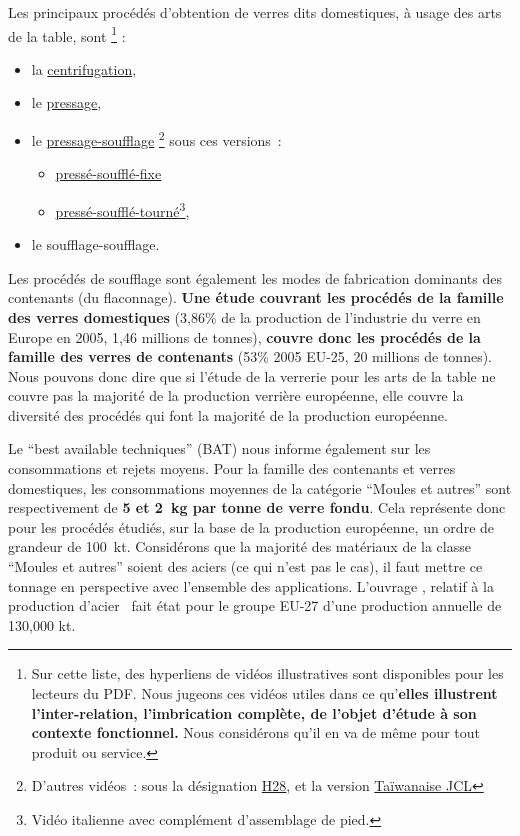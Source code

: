 Les principaux procédés d'obtention de verres dits domestiques, à usage des arts de la table, sont
\footnote{
Sur cette liste, des hyperliens de vidéos illustratives sont disponibles pour les lecteurs du PDF.
Nous jugeons ces vidéos utiles dans ce qu'\textbf{elles illustrent l'inter-relation, l'imbrication complète, de l'objet d'étude à son contexte fonctionnel.}
Nous considérons qu'il en va de même pour tout produit ou service.
} :
\begin{itemize}
\item la \href{https://www.youtube.com/watch?v=HQw2rP-yffU}{centrifugation},
\item le \href{https://www.youtube.com/watch?v=f4q5RphNFwo}{pressage},
\item le \href{https://www.youtube.com/watch?v=o_HqEeMmrfI}{pressage-soufflage}
\footnote{
D'autres vidéos~: sous la désignation \href{https://www.youtube.com/watch?v=SypruPV9CNw}{H28}, et la version \href{https://www.youtube.com/watch?v=Dqo06N7eofA}{Taïwanaise JCL}
}
sous ces versions~:
\begin{itemize}
\item \href{https://www.youtube.com/watch?v=ixAIrgkHnIo}{pressé-soufflé-fixe}
\item \href{https://www.youtube.com/watch?v=FsVtEcqe4co}{pressé-soufflé-tourné}\footnote{ Vidéo italienne avec complément d'assemblage de pied.},
\end{itemize}
\item le soufflage-soufflage.
\end{itemize}
Les procédés de soufflage sont également les modes de fabrication dominants des contenants (du flaconnage).
\textbf{Une étude couvrant les procédés de la famille des verres domestiques} (3,86\% de la production de l'industrie du verre en Europe en 2005, 1,46 millions de tonnes), \textbf{couvre donc les procédés de la famille des verres de contenants} (53\% 2005 EU-25, 20 millions de tonnes).
Nous pouvons donc dire que si l'étude de la verrerie pour les arts de la table ne couvre pas la majorité de la production verrière européenne, elle couvre la diversité des procédés qui font la majorité de la production européenne.

Le ``best available techniques'' (BAT) nous informe également sur les consommations et rejets moyens.
Pour la famille des contenants et verres domestiques, les consommations moyennes de la catégorie ``Moules et autres'' sont respectivement de \textbf{5 et 2~kg par tonne de verre fondu}.
Cela représente donc pour les procédés étudiés, sur la base de la production européenne, un ordre de grandeur de 100~kt.
Considérons que la majorité des matériaux de la classe ``Moules et autres'' soient des aciers (ce qui n'est pas le cas), il faut mettre ce tonnage en perspective avec l'ensemble des applications.
L'ouvrage , relatif à la production d'acier~\cite{remus_best_2013} fait état pour le groupe EU-27 d'une production annuelle de 130,000 kt.

